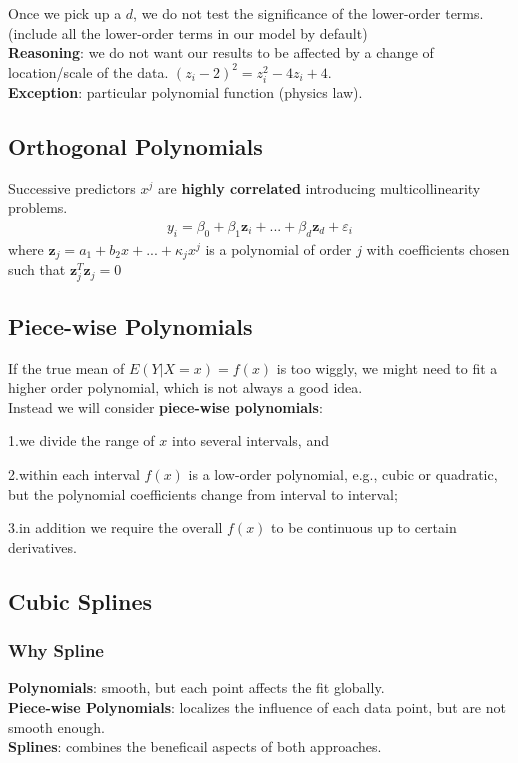 \documentclass[11pt,a4paper]{article}
\begin{document}
Once we pick up a $d$, we do not test the signiﬁcance of the lower-order terms. (include all the lower-order terms in our model by default)\\
\textbf{Reasoning}: we do not want our results to be affected by a change of location/scale of the data. $(z_i-2)^2=z_i^2-4z_i+4$.\\
\textbf{Exception}: particular polynomial function (physics law).


\subsection{Orthogonal Polynomials}
Successive predictors $x^j$ are \textbf{highly correlated} introducing multicollinearity problems.
\begin{equation}
    \begin{aligned}
        y_i=\beta_0+\beta_1 \mathbf{z}_i+...+\beta_d \mathbf{z}_d+\varepsilon_i
    \end{aligned}
    \nonumber
\end{equation}
where $\mathbf{z}_j=a_1+b_2x+...+\kappa_j x^j$ is a polynomial of order $j$ with coefficients chosen such that $\mathbf{z}_j^T\mathbf{z}_j=0$

\subsection{Piece-wise Polynomials}
If the true mean of $E(Y | X = x) = f (x)$ is too wiggly, we might need to ﬁt a higher order polynomial, which is not always a good idea.\\

Instead we will consider \textbf{piece-wise polynomials}:

1.we divide the range of $x$ into several intervals, and

2.within each interval $f (x)$ is a low-order polynomial, e.g., cubic or quadratic, but the polynomial coeﬃcients change from interval to interval;

3.in addition we require the overall $f (x)$ to be continuous up to certain derivatives.

\subsection{Cubic Splines}
\subsubsection{Why Spline}
\textbf{Polynomials}: smooth, but each point affects the fit globally.\\
\textbf{Piece-wise Polynomials}: localizes the influence of each data point, but are not smooth enough.\\
\textbf{Splines}: combines the beneficail aspects of both approaches.\\
\end{document}
